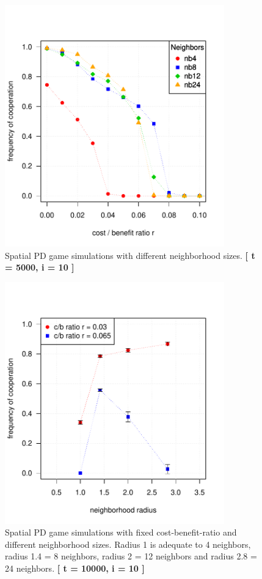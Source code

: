 \begin{figure}[H]
	\centering 
	\includegraphics[width=9.5cm]{task2_multiplot}
	\caption{Spatial PD game simulations with different neighborhood sizes.  \textbf{[ t = 5000, i = 10 ]} }\label{fig: task2_multiplot}
\end{figure}




\begin{figure}[H]
	\centering 
	\includegraphics[width=9.5cm]{task2_radiusplot}
	\caption{Spatial PD game simulations with fixed cost-benefit-ratio and different neighborhood sizes. Radius 1 is adequate to 4 neighbors, radius 1.4 = 8 neighbors, radius 2 = 12 neighbors and radius 2.8 = 24 neighbors.  \textbf{[ t = 10000, i = 10 ]} }\label{fig: task2_radiusplot}
\end{figure}


